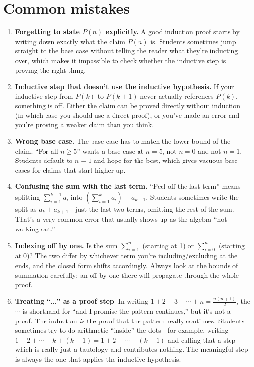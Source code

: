 \documentclass[11pt]{article}
\begin{document}
\section{Common mistakes}

\begin{enumerate}
  \item \textbf{Forgetting to state $P(n)$ explicitly.} A good induction proof starts by writing down exactly what the claim $P(n)$ is. Students sometimes jump straight to the base case without telling the reader what they're inducting over, which makes it impossible to check whether the inductive step is proving the right thing.
  \item \textbf{Inductive step that doesn't use the inductive hypothesis.} If your inductive step from $P(k)$ to $P(k+1)$ never actually references $P(k)$, something is off. Either the claim can be proved directly without induction (in which case you should use a direct proof), or you've made an error and you're proving a weaker claim than you think.
  \item \textbf{Wrong base case.} The base case has to match the lower bound of the claim. ``For all $n \geq 5$'' wants a base case at $n = 5$, not $n = 0$ and not $n = 1$. Students default to $n = 1$ and hope for the best, which gives vacuous base cases for claims that start higher up.
  \item \textbf{Confusing the sum with the last term.} ``Peel off the last term'' means splitting $\sum_{i=1}^{k+1} a_i$ into $(\sum_{i=1}^{k} a_i) + a_{k+1}$. Students sometimes write the split as $a_k + a_{k+1}$---just the last two terms, omitting the rest of the sum. That's a very common error that usually shows up as the algebra ``not working out.''
  \item \textbf{Indexing off by one.} Is the sum $\sum_{i=1}^{n}$ (starting at 1) or $\sum_{i=0}^{n}$ (starting at 0)? The two differ by whichever term you're including/excluding at the ends, and the closed form shifts accordingly. Always look at the bounds of summation carefully; an off-by-one there will propagate through the whole proof.
  \item \textbf{Treating ``$\ldots$'' as a proof step.} In writing $1 + 2 + 3 + \cdots + n = \frac{n(n+1)}{2}$, the $\cdots$ is shorthand for ``and I promise the pattern continues,'' but it's not a proof. The induction \emph{is} the proof that the pattern really continues. Students sometimes try to do arithmetic ``inside'' the dots---for example, writing $1 + 2 + \cdots + k + (k+1) = 1 + 2 + \cdots + (k+1)$ and calling that a step---which is really just a tautology and contributes nothing. The meaningful step is always the one that applies the inductive hypothesis.
\end{enumerate}
\end{document}
